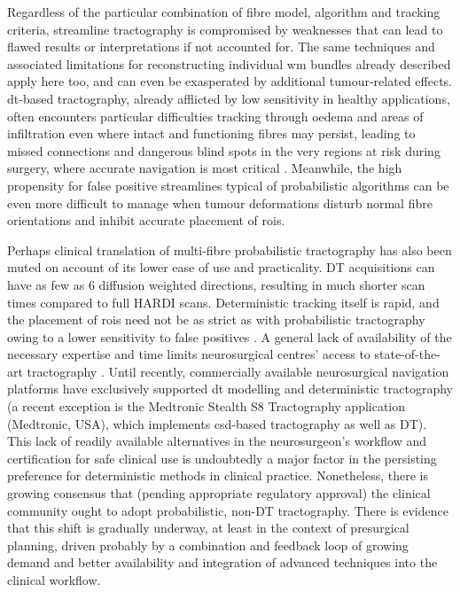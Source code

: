 Regardless of the particular combination of fibre model, algorithm and tracking criteria, streamline tractography is compromised by weaknesses that can lead to flawed results or interpretations if not accounted for\autocite{Rheault2020, Schilling2022, Schilling2019}.
The same techniques and associated limitations for reconstructing individual \gls{wm} bundles already described apply here too, and can even be exasperated by additional tumour-related effects.
\gls{dt}-based tractography, already afflicted by low sensitivity in healthy applications, often encounters particular difficulties tracking through oedema and areas of infiltration even where intact and functioning fibres may persist\autocite{Leclercq2010}, leading to missed connections and dangerous blind spots in the very regions at risk during surgery, where accurate navigation is most critical \autocite{Kuhnt2013,Ashmore2020}.
Meanwhile, the high propensity for false positive streamlines typical of probabilistic algorithms can be even more difficult to manage when tumour deformations disturb normal fibre orientations and inhibit accurate placement of \glspl{roi}\autocite{Yang2021}.

Perhaps clinical translation of multi-fibre probabilistic tractography has also been muted on account of its lower ease of use and practicality.
DT acquisitions can have as few as 6 diffusion weighted directions, resulting in much shorter scan times compared to full HARDI scans.
Deterministic tracking itself is rapid, and the placement of \glspl{roi} need not be as strict as with probabilistic tractography owing to a lower sensitivity to false positives \autocite{ODonnell2017}.
A general lack of availability of the necessary expertise and time limits neurosurgical centres' access to state-of-the-art tractography \autocite{Toescu2020}.
Until recently, commercially available neurosurgical navigation platforms have exclusively supported \gls{dt} modelling and deterministic tractography (a recent exception is the Medtronic Stealth\texttrademark{} S8 Tractography application (Medtronic, USA), which implements \gls{csd}-based tractography\autocite{Pozzilli2023} as well as DT).
This lack of readily available alternatives in the neurosurgeon's workflow and certification for safe clinical use is undoubtedly a major factor in the persisting preference for deterministic methods in clinical practice.
Nonetheless, there is growing consensus that (pending appropriate regulatory approval) the clinical community ought to adopt probabilistic, non-DT tractography\autocite{Yang2021, Beare2022, Petersen2017}.
There is evidence that this shift is gradually underway, at least in the context of presurgical planning\autocite{Toescu2020}, driven probably by a combination and feedback loop of growing demand and better availability and integration of advanced techniques into the clinical workflow.

